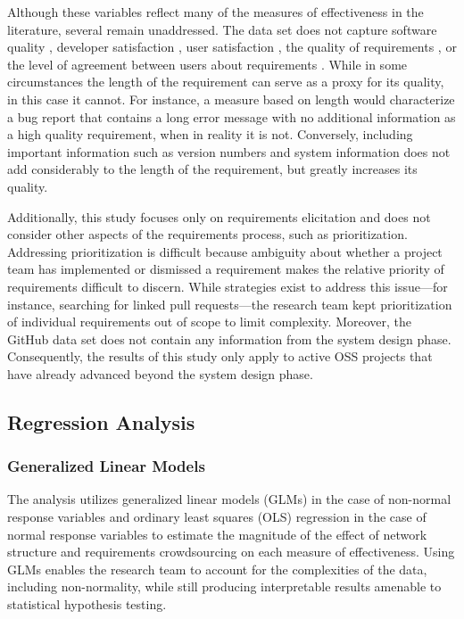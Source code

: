 Although these variables reflect many of the  measures of effectiveness in the literature, several remain unaddressed. The data set does not capture software quality \cite{stewart}, developer satisfaction \cite{ghapanchi}, user satisfaction \cite{ghapanchi}, the quality of requirements \cite{ma}, or the level of agreement between users about requirements \cite{ma}. While in some circumstances \cite{pagano} the length of the requirement can serve as a proxy for its quality, in this case it cannot. For instance, a measure based on length would characterize a bug report that contains a long error message with no additional information as a high quality requirement, when in reality it is not. Conversely, including important information such as version numbers and system information does not add considerably to the length of the requirement, but greatly increases its quality.

Additionally, this study focuses only on requirements elicitation and does not consider other aspects of the requirements process, such as prioritization. Addressing prioritization is difficult because ambiguity about whether a project team has implemented or dismissed a requirement makes the relative priority of requirements difficult to discern. While strategies exist to address this issue---for instance, searching for linked pull requests---the research team kept prioritization of individual requirements out of scope to limit complexity. Moreover, the GitHub data set does not contain any information from the system design phase. Consequently, the results of this study only apply to active OSS projects that have already advanced beyond the system design phase.

\subsection{Regression Analysis}

\subsubsection{Generalized Linear Models}
\label{glm}

The analysis utilizes generalized linear models (GLMs) in the case of non-normal response variables and ordinary least squares (OLS) regression in the case of normal response variables to estimate the magnitude of the effect of network structure and requirements crowdsourcing on each measure of effectiveness. Using GLMs enables the research team to account for the complexities of the data, including non-normality, while still producing interpretable results amenable to statistical hypothesis testing.

